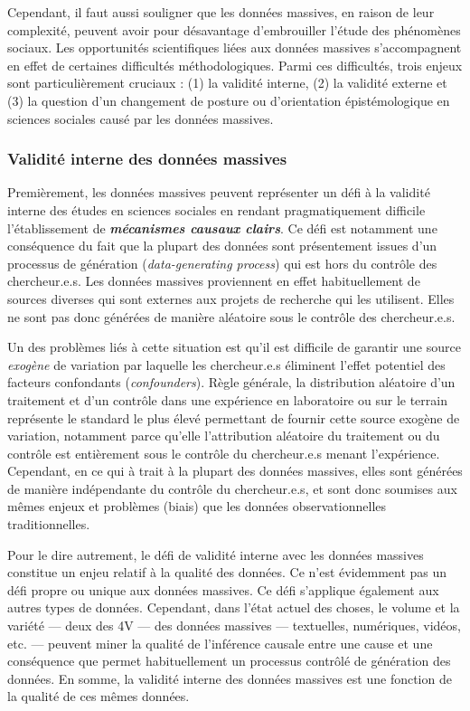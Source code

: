 \documentclass[
  letterpaper,
  DIV=11,
  numbers=noendperiod]{scrreprt}
\begin{document}
Cependant, il faut aussi souligner que les données massives, en raison
de leur complexité, peuvent avoir pour désavantage d'embrouiller l'étude
des phénomènes sociaux. Les opportunités scientifiques liées aux données
massives s'accompagnent en effet de certaines difficultés
méthodologiques. Parmi ces difficultés, trois enjeux sont
particulièrement cruciaux : (1) la validité interne, (2) la validité
externe et (3) la question d'un changement de posture ou d'orientation
épistémologique en sciences sociales causé par les données massives.

\subsubsection*{Validité interne des données
massives}\label{validituxe9-interne-des-donnuxe9es-massives}

Premièrement, les données massives peuvent représenter un défi à la
validité interne des études en sciences sociales en rendant
pragmatiquement difficile l'établissement de \textbf{\emph{mécanismes
causaux clairs}}. Ce défi est notamment une conséquence du fait que la
plupart des données sont présentement issues d'un processus de
génération (\emph{data-generating process}) qui est hors du contrôle des
chercheur.e.s. Les données massives proviennent en effet habituellement
de sources diverses qui sont externes aux projets de recherche qui les
utilisent. Elles ne sont pas donc générées de manière aléatoire sous le
contrôle des chercheur.e.s.

Un des problèmes liés à cette situation est qu'il est difficile de
garantir une source \emph{exogène} de variation par laquelle les
chercheur.e.s éliminent l'effet potentiel des facteurs confondants
(\emph{confounders}). Règle générale, la distribution aléatoire d'un
traitement et d'un contrôle dans une expérience en laboratoire ou sur le
terrain représente le standard le plus élevé permettant de fournir cette
source exogène de variation, notamment parce qu'elle l'attribution
aléatoire du traitement ou du contrôle est entièrement sous le contrôle
du chercheur.e.s menant l'expérience. Cependant, en ce qui à trait à la
plupart des données massives, elles sont générées de manière
indépendante du contrôle du chercheur.e.s, et sont donc soumises aux
mêmes enjeux et problèmes (biais) que les données observationnelles
traditionnelles.

Pour le dire autrement, le défi de validité interne avec les données
massives constitue un enjeu relatif à la qualité des données. Ce n'est
évidemment pas un défi propre ou unique aux données massives. Ce défi
s'applique également aux autres types de données. Cependant, dans l'état
actuel des choses, le volume et la variété --- deux des 4V --- des
données massives --- textuelles, numériques, vidéos, etc. --- peuvent
miner la qualité de l'inférence causale entre une cause et une
conséquence que permet habituellement un processus contrôlé de
génération des données. En somme, la validité interne des données
massives est une fonction de la qualité de ces mêmes données.
\end{document}
